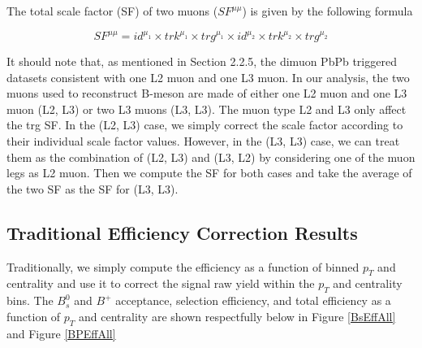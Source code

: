 The total scale factor (SF) of two muons ($SF^{\mu\mu}$) is given by the following formula

\begin{equation}
SF^{\mu\mu} = id^{\mu_1} \times trk^{\mu_1}  \times trg^{\mu_1}  \times id^{\mu_2}  \times trk^{\mu_2}  \times trg^{\mu_2} 
\end{equation}

It should note that, as mentioned in Section 2.2.5, the dimuon PbPb triggered datasets consistent with one L2 muon and one L3 muon. In our analysis, the two muons used to reconstruct B-meson are made of either one L2 muon and one L3 muon (L2, L3) or two L3 muons (L3, L3). The muon type L2 and L3 only affect the trg SF. In the (L2, L3) case, we simply correct the scale factor according to their individual scale factor values. However, in the (L3, L3) case, we can treat them as the combination of (L2, L3) and (L3, L2) by considering one of the muon legs as L2 muon. Then we compute the SF for both cases and take the average of the two SF as the SF for (L3, L3).  

\subsection{Traditional Efficiency Correction Results}

Traditionally, we simply compute the efficiency as a function of binned $p_T$ and centrality and use it to correct the signal raw yield within the $p_T$ and centrality bins. The $B^0_s$ and $B^+$ acceptance, selection efficiency, and total efficiency as a function of $p_T$ and centrality are shown respectfully below in Figure \ref{BsEffAll} and Figure \ref{BPEffAll}

